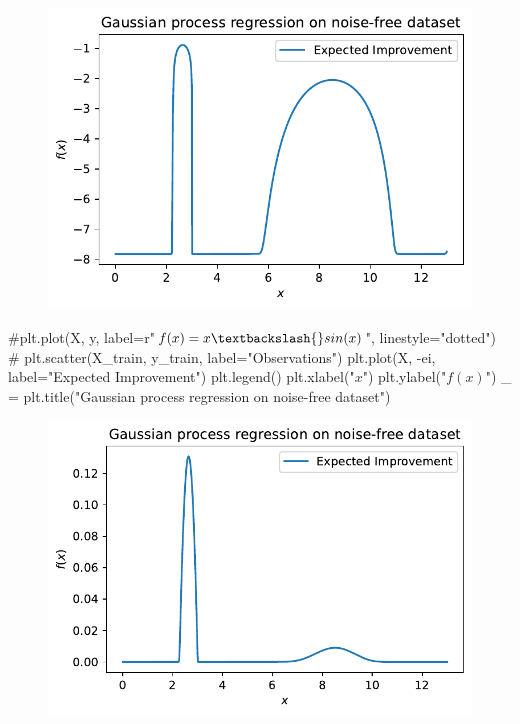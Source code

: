 \documentclass[
  letterpaper,
  DIV=11,
  numbers=noendperiod]{scrreprt}
\newenvironment{Shaded}{\begin{snugshade}}{\end{snugshade}}
\newcommand{\CommentTok}[1]{\textcolor[rgb]{0.37,0.37,0.37}{#1}}
\newcommand{\NormalTok}[1]{\textcolor[rgb]{0.00,0.23,0.31}{#1}}
\newcommand{\OperatorTok}[1]{\textcolor[rgb]{0.37,0.37,0.37}{#1}}
\newcommand{\StringTok}[1]{\textcolor[rgb]{0.13,0.47,0.30}{#1}}
\begin{document}
\begin{figure}[H]

{\centering \includegraphics{012_num_spot_ei_files/figure-pdf/cell-45-output-1.pdf}

}

\end{figure}

\begin{Shaded}
\begin{Highlighting}[]
\CommentTok{\#plt.plot(X, y, label=r"$f(x) = x \textbackslash{}sin(x)$", linestyle="dotted")}
\CommentTok{\# plt.scatter(X\_train, y\_train, label="Observations")}
\NormalTok{plt.plot(X, }\OperatorTok{{-}}\NormalTok{ei, label}\OperatorTok{=}\StringTok{"Expected Improvement"}\NormalTok{)}
\NormalTok{plt.legend()}
\NormalTok{plt.xlabel(}\StringTok{"$x$"}\NormalTok{)}
\NormalTok{plt.ylabel(}\StringTok{"$f(x)$"}\NormalTok{)}
\NormalTok{\_ }\OperatorTok{=}\NormalTok{ plt.title(}\StringTok{"Gaussian process regression on noise{-}free dataset"}\NormalTok{)}
\end{Highlighting}
\end{Shaded}

\begin{figure}[H]

{\centering \includegraphics{012_num_spot_ei_files/figure-pdf/cell-46-output-1.pdf}

}

\end{figure}
\end{document}
